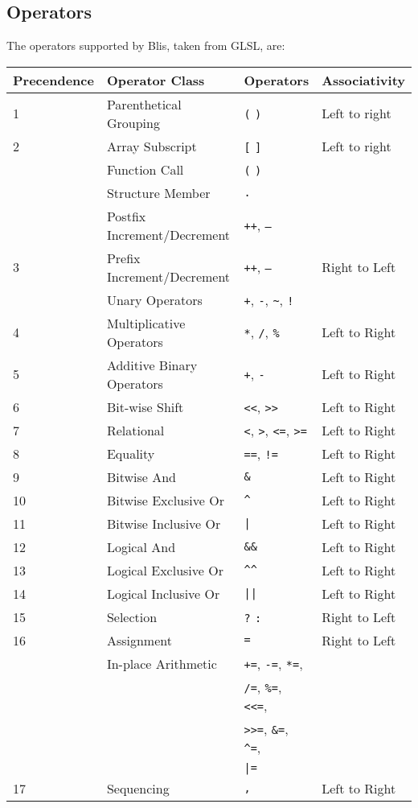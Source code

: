 \documentclass[11pt]{article}
\newcommand{\code}[1]{\texttt{#1}}
\begin{document}
\subsection{Operators} \label{operators}

The operators supported by Blis, taken from GLSL, are:

\vspace{3mm}

\begin{tabular}{| l | l | l | l |}
\hline
Precendence & Operator Class & Operators & Associativity \\ \hline
1 & Parenthetical Grouping 	& \code{(} \code{)} & Left to right \\ \hline
2 & Array Subscript & \code{[} \code{]} & Left to right \\
  & Function Call & \code{(} \code{)} & \\
  & Structure Member & \code{.} &  \\
  & Postfix Increment/Decrement & \code{++}, \code{--} & \\ \hline
3 & Prefix Increment/Decrement & \code{++}, \code{--} & Right to Left \\
  & Unary Operators & \code{+}, \code{-}, \code{\textasciitilde}, \code{!} & \\ \hline
4 & Multiplicative Operators & \code{*}, \code{/}, \code{\%} & Left to Right  \\ \hline
5 & Additive Binary Operators & \code{+}, \code{-} & Left to Right \\ \hline
6 & Bit-wise Shift & \code{<<}, \code{>>} & Left to Right \\ \hline
7 & Relational & \code{<}, \code{>}, \code{<=}, \code{>=} & Left to Right \\ \hline
8 & Equality & \code{==}, \code{!=} & Left to Right \\ \hline
9 & Bitwise And & \code{\&} & Left to Right \\ \hline
10 & Bitwise Exclusive Or & \code{\textasciicircum} & Left to Right \\ \hline
11 & Bitwise Inclusive Or & \code{|} & Left to Right \\ \hline
12 & Logical And & \code{\&\&} & Left to Right \\ \hline
13 & Logical Exclusive Or & \code{\textasciicircum\textasciicircum} & Left to Right \\ \hline
14 & Logical Inclusive Or & \code{||} & Left to Right \\ \hline
15 & Selection & \code{?} \code{:} & Right to Left \\ \hline
16 & Assignment & \code{=} & Right to Left \\
   & In-place Arithmetic & \code{+=}, \code{-=}, \code{*=}, & \\
   &                     & \code{/=}, \code{\%=}, \code{<<=}, & \\
   &                     & \code{>>=}, \code{\&=}, \code{\textasciicircum=}, & \\
   &                     & \code{|=} & \\ \hline
17 & Sequencing & \code{,} & Left to Right \\ \hline


\end{tabular}
\end{document}
